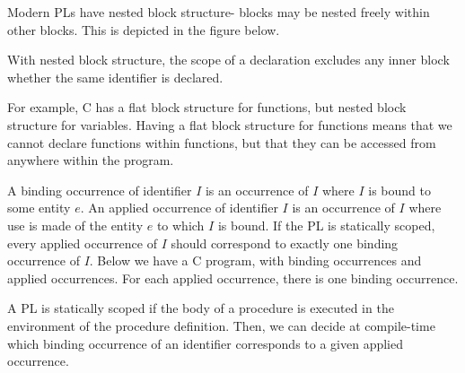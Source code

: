 \documentclass[a4paper, openany]{memoir}
\begin{document}
Modern PLs have nested block structure- blocks may be nested freely within other blocks. This is depicted in the figure below.
\begin{figure}[H]
    \centering
\end{figure}
\noindent With nested block structure, the scope of a declaration excludes any inner block whether the same identifier is declared.

For example, C has a flat block structure for functions, but nested block structure for variables. 
Having a flat block structure for functions means that we cannot declare functions within functions, but that they can be accessed from anywhere within the program.

A binding occurrence of identifier $I$ is an occurrence of $I$ where $I$ is bound to some entity $e$. An applied occurrence of identifier $I$ is an occurrence of $I$ where use is made of the entity $e$ to which $I$ is bound. If the PL is statically scoped, every applied occurrence of $I$ should correspond to exactly one binding occurrence of $I$. Below we have a C program, with binding occurrences and applied occurrences.
For each applied occurrence, there is one binding occurrence.

A PL is statically scoped if the body of a procedure is executed in the environment of the procedure definition. Then, we can decide at compile-time which binding occurrence of an identifier corresponds to a given applied occurrence. 
\end{document}
